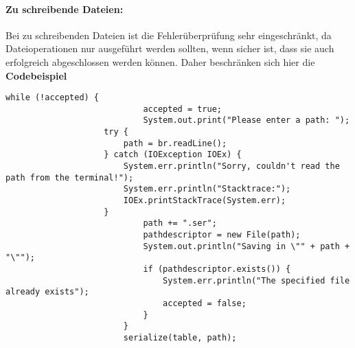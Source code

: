 \documentclass[11pt]{article}
\begin{document}
\begin{samepage}
  \paragraph{Zu schreibende Dateien:}
Bei zu schreibenden Dateien ist die Fehlerüberprüfung sehr eingeschränkt, da Dateioperationen nur ausgeführt werden sollten, wenn sicher ist, dass sie auch erfolgreich abgeschlossen werden können. Daher beschränken sich hier die 
  \textbf{Codebeispiel}
  \begin{lstlisting}[caption=Überprüfung eines Ausgabedateipfads, label=lst:OutputPathValidation]
                          while (!accepted) {
                            accepted = true;
                            System.out.print("Please enter a path: ");
                    try {
                        path = br.readLine();
                    } catch (IOException IOEx) {
                        System.err.println("Sorry, couldn't read the path from the terminal!");
                        System.err.println("Stacktrace:");
                        IOEx.printStackTrace(System.err);
                    }
                            path += ".ser";
                            pathdescriptor = new File(path);
                            System.out.println("Saving in \"" + path + "\"");
                            if (pathdescriptor.exists()) {
                                System.err.println("The specified file already exists");
                                accepted = false;
                            }
                        }
                        serialize(table, path);
  \end{lstlisting}
  \end{samepage}
  \pagebreak
\end{document}
